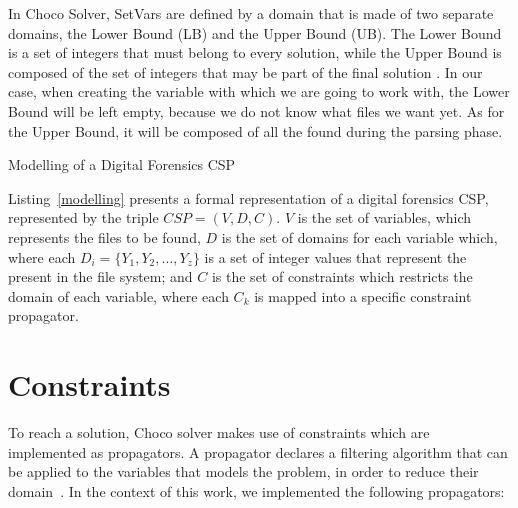 In Choco Solver, SetVars are defined by a domain that is made of two separate domains, the Lower Bound (LB) and the Upper Bound (UB). The Lower Bound is a set of integers that must belong to every solution, while the Upper Bound is composed of the set of integers that may be part of the final solution \cite{SetVar}. In our case, when creating the variable with which we are going to work with, the Lower Bound will be left empty, because we do not know what files we want yet. As for the  Upper Bound, it will be composed of all the \INODES found during the parsing phase.


\begin{algorithm}
    \caption{Modelling of a Digital Forensics CSP}
    \label{modelling}
    \begin{algorithmic}
        \State{}
        \State{}
        \State{}
        \State{}
        \State{}
    \end{algorithmic}
\end{algorithm}

Listing~\ref{modelling} presents a formal representation of a digital forensics CSP, represented by the triple $CSP = (V,D,C)$. $V$ is the set of variables, which represents the files to be found, $D$ is the set of domains for each variable which, where each $D_i = \{Y_1,Y_2,\ldots,Y_z\}$ is a set of integer values that represent the \INODES present in the file system; and $C$ is the set of constraints which restricts the domain of each variable, where each $C_k$ is mapped into a specific constraint propagator.

\section{Constraints}
\label{Constraints}

To reach a solution, Choco solver makes use of constraints which are implemented as propagators. A propagator declares a filtering algorithm that can be applied to the variables that models the problem, in order to reduce their domain~\cite{Propagator}. In the context of this work, we implemented the following propagators:

